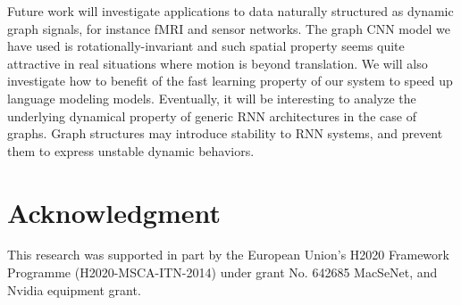 \documentclass{article}
\newcommand{\todo}[1]{{\color{red} #1 }}
\begin{document}
Future work will investigate applications to data naturally structured as
dynamic graph signals, for instance fMRI and sensor networks. The graph CNN
model we have used is rotationally-invariant and such spatial property seems
quite attractive in real situations where motion is beyond translation. We will
also investigate how to benefit of the fast learning property of our system to
speed up language modeling models. Eventually, it will be interesting to
analyze the underlying dynamical property of generic RNN architectures in the
case of graphs. Graph structures may introduce stability to RNN systems, and
prevent them to express unstable dynamic behaviors.


\section*{Acknowledgment}

This research was supported in part by the European Union's H2020 Framework
Programme (H2020-MSCA-ITN-2014) under grant No. 642685 MacSeNet, and Nvidia
equipment grant.


{
	\small
	
	
}
\end{document}
